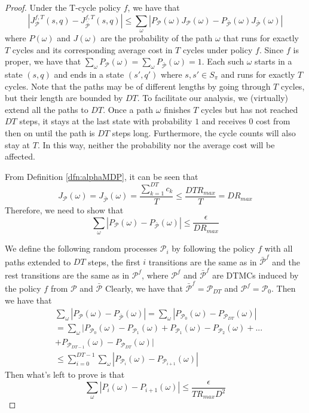 \documentclass[journal]{IEEEtran}
\begin{document}
\begin{proof}
	Under the T-cycle policy $f$, we have that
	$$
	|J^{f,T}_{\mathcal{P}}(s,q)-J^{f,T}_{\bar{\mathcal{P}}}(s,q)| \leq \sum_{\omega}|P_{\mathcal{P}}(\omega) J_{\mathcal{P}}(\omega)-P_{\bar{\mathcal{P}}} (\omega) J_{\bar{\mathcal{P}}}(\omega)|
	$$
	where $P(\omega)$ and $J(\omega)$ are the probability of the path $\omega$ that runs for exactly $T$ cycles  and its corresponding average cost in $T$ cycles under policy $f$. Since $f$ is proper, we have that $\sum_{\omega}P_{\mathcal{P}} (\omega)= \sum_{\omega}P_{\bar{\mathcal{P}}}(\omega)=1$. Each such $\omega$ starts in a state $(s,q)$ and ends in a state $(s',q')$ where $s,s'\in S_\pi$ and runs for exactly $T$ cycles. Note that the paths may be of different lengths by going through $T$ cycles, but their length are bounded by $DT$. To facilitate our analysis, we (virtually) extend all the paths to $DT$. Once a path $\omega$ finishes $T$ cycles but has not reached $DT$ steps, it stays at the last state with probability $1$ and receives $0$ cost from then on until the path is $DT$ steps long. Furthermore, the cycle counts will also stay at $T$. In this way, neither the probability nor the average cost will be affected. 
	
	From Definition \ref{dfn:alphaMDP}, it can be seen that 
	$$
	J_{\mathcal{P}}(\omega)=J_{\bar{\mathcal{P}}}(\omega)=\frac{\sum_{k=1}^{DT}c_k}{T}\leq \frac{DTR_{max}}{T} = DR_{max}
	$$
	Therefore, we need to show that
	$$
	\sum_{\omega}|P_{\mathcal{P}}(\omega) -P_{\bar{\mathcal{P}}} (\omega) |\leq \frac{\epsilon}{DR_{max}}
	$$
	
	We define the following random processes $\mathcal{P}_i$ by following the policy $f$ with all paths extended to $DT$ steps, the first $i$ transitions are the same as in $\bar{\mathcal{P}}^f$ and the rest transitions are the same as in $\mathcal{P}^f$, where $\mathcal{P}^f$ and $\bar{\mathcal{P}}^f$ are DTMCs induced by the policy $f$ from $\mathcal{P}$ and $\bar{\mathcal{P}}$ Clearly, we have that $\bar{\mathcal{P}}^f=\mathcal{P}_{DT}$ and $\mathcal{P}^f=\mathcal{P}_0$. Then we have that
	\begin{equation} \label{eqn:sum}
		\begin{split}
			&\sum_{\omega}|P_{\mathcal{P}}(\omega)-P_{\bar{\mathcal{P}}} (\omega) |=\sum_{\omega}|P_{\mathcal{P}_0}(\omega) -P_{\mathcal{P}_{DT}} (\omega) |\\
			&=\sum_{\omega}|P_{\mathcal{P}_0}(\omega)-P_{\mathcal{P}_1}(\omega)+P_{\mathcal{P}_1}(\omega)-P_{\mathcal{P}_2}(\omega)+...\\
			&+P_{\mathcal{P}_{DT-1}} (\omega) -P_{\mathcal{P}_{DT}} (\omega) |\\
			&\leq \sum_{i=0}^{DT-1}\sum_{\omega}|P_{\mathcal{P}_{i}} (\omega) -P_{\mathcal{P}_{i+1}}(\omega)|
		\end{split}
	\end{equation}
	Then what's left to prove is that 
	\begin{equation}\label{eqn:desired}
		\sum_{\omega}|P_{{i}} (\omega) -P_{{i+1}}(\omega)|\leq\frac{\epsilon}{TR_{max}D^2}
	\end{equation}
	

\end{proof}
\end{document}

